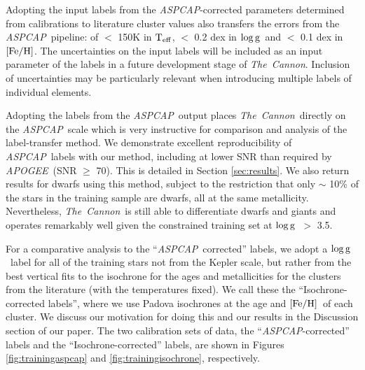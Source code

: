 \documentclass[12pt, preprint]{aastex}
\newcommand{\teff}{\mbox{$\rm T_{eff}$}}
\newcommand{\feh}{\mbox{$\rm [Fe/H]$}}
\newcommand{\logg}{\mbox{$\rm \log g$}}
\newcommand{\tc}{\textsl{The~Cannon}}
\newcommand{\apogee}{\textsl{APOGEE}}
\newcommand{\aspcap}{\textsl{ASPCAP}}
\begin{document}
Adopting the input labels from the \aspcap-corrected parameters determined from calibrations to literature cluster values also transfers the errors from the \aspcap\ pipeline: of $<$ 150K in \teff,  $<$ 0.2 dex in \logg\ and $<$ 0.1 dex in \feh.   The uncertainties on the input labels will be included as an input parameter of the labels in a future development stage of \tc. Inclusion of uncertainties may be particularly relevant when introducing multiple labels of individual elements. 

Adopting the labels from the \aspcap\ output places \tc\ directly on the \aspcap\ scale which is very instructive for comparison and analysis of the label-transfer method. We demonstrate excellent reproducibility of \aspcap\ labels with our method, including at lower SNR than required by \apogee\ (SNR $\ge$ 70). This is detailed in Section \ref{sec:results}. We also return results for dwarfs using this method, subject to the restriction that only $\sim$ 10\% of the stars in the training sample are dwarfs, all at the same metallicity. Nevertheless, \tc\ is still able to differentiate dwarfs and giants and operates remarkably well given the constrained training set at \logg\ $>$ 3.5. 

For a comparative analysis to the ``\aspcap\ corrected'' labels, we adopt a \logg\ label for all of the training stars not from the Kepler scale, but rather from the best vertical fits to the isochrone for the ages and metallicities for the clusters from the literature (with the temperatures fixed). We call these the ``Isochrone-corrected labels'', where we use Padova isochrones at the age and \feh\ of each cluster. We discuss our motivation for doing this and our results in the Discussion section of our paper.  The two calibration sets of data, the ``\aspcap-corrected'' labels and the ``Isochrone-corrected'' labels, are shown in Figures \ref{fig:trainingaspcap} and \ref{fig:trainingisochrone}, respectively. 
\end{document}

